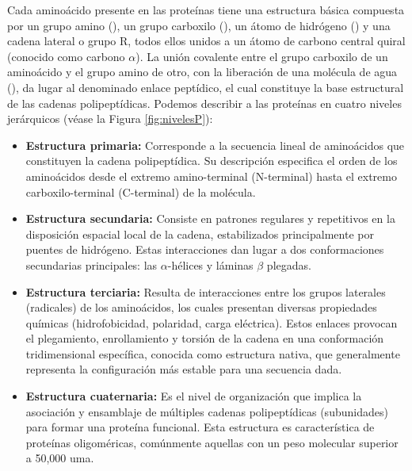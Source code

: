 Cada amino\'{a}cido presente en las proteínas tiene una estructura b\'{a}sica compuesta por un grupo amino (), un grupo carboxilo (), un \'{a}tomo de hidr\'{o}geno () y una cadena lateral o grupo R, todos ellos unidos a un \'{a}tomo de carbono central quiral (conocido como carbono $\alpha$). La uni\'{o}n covalente entre el grupo carboxilo de un amino\'{a}cido y el grupo amino de otro, con la liberaci\'{o}n de una mol\'{e}cula de agua (), da lugar al denominado enlace pept\'{i}dico, el cual constituye la base estructural de las cadenas polipept\'{i}dicas. Podemos describir a las prote\'{i}nas en cuatro niveles jer\'{a}rquicos (v\'{e}ase la Figura \ref{fig:nivelesP}):

\begin{itemize}


	\item \textbf{Estructura primaria:} Corresponde a la secuencia lineal de amino\'{a}cidos que constituyen la cadena polipept\'{i}dica. Su descripci\'{o}n especifica el orden de los amino\'{a}cidos desde el extremo amino-terminal (N-terminal) hasta el extremo carboxilo-terminal (C-terminal) de la mol\'{e}cula.
	
	\item \textbf{Estructura secundaria:} Consiste en patrones regulares y repetitivos en la disposici\'{o}n espacial local de la cadena, estabilizados principalmente por puentes de hidr\'{o}geno. Estas interacciones dan lugar a dos conformaciones secundarias principales: las $\alpha$-h\'{e}lices y l\'{a}minas $\beta$ plegadas.
	
	\item \textbf{Estructura terciaria:} Resulta de interacciones entre los grupos laterales (radicales) de los amino\'{a}cidos, los cuales presentan diversas propiedades qu\'{i}micas  (hidrofobicidad, polaridad, carga el\'{e}ctrica). Estos enlaces provocan el plegamiento, enrollamiento y torsi\'{o}n de la cadena en una conformaci\'{o}n tridimensional espec\'{i}fica, conocida como estructura nativa, que generalmente representa la configuraci\'{o}n m\'{a}s estable para una secuencia dada.
	
	\item \textbf{Estructura cuaternaria:} Es el nivel de organizaci\'{o}n que implica la asociaci\'{o}n y ensamblaje de m\'{u}ltiples cadenas polipept\'{i}dicas (subunidades) para formar una prote\'{i}na funcional. Esta estructura es caracter\'{i}stica de prote\'{i}nas oligom\'{e}ricas, com\'{u}nmente aquellas con un peso molecular superior a 50,000 uma.
\end{itemize}

